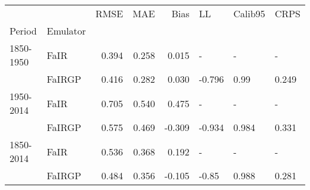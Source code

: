 \begin{tabular}{llrrrlll}
\toprule
          &        &   RMSE &    MAE &   Bias &     LL & Calib95 &   CRPS \\
Period & Emulator &        &        &        &        &         &        \\
\midrule
1850-1950 & FaIR &  0.394 &  0.258 &  0.015 &      - &       - &      - \\
          & FaIRGP &  0.416 &  0.282 &  0.030 & -0.796 &    0.99 &  0.249 \\
1950-2014 & FaIR &  0.705 &  0.540 &  0.475 &      - &       - &      - \\
          & FaIRGP &  0.575 &  0.469 & -0.309 & -0.934 &   0.984 &  0.331 \\
1850-2014 & FaIR &  0.536 &  0.368 &  0.192 &      - &       - &      - \\
          & FaIRGP &  0.484 &  0.356 & -0.105 &  -0.85 &   0.988 &  0.281 \\
\bottomrule
\end{tabular}

